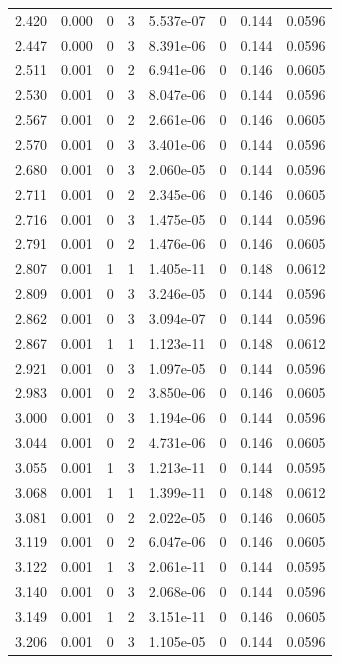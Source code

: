 \documentclass[preview]{standalone}
\begin{document}
{{{\begin{tabular}{L{1.2cm}C{1.2cm} C{0.3cm}C{0.5cm} C{1.4cm}C{1.4cm} C{1.4cm}C{1.4cm}}
  2.420  &  0.000  & 0     &  3 &  5.537e-07  & 0  & 0.144 &  0.0596   \\ 
  2.447  &  0.000  & 0     &  3 &  8.391e-06  & 0  & 0.144 &  0.0596   \\ 
  2.511  &  0.001  & 0     &  2 &  6.941e-06  & 0  & 0.146 &  0.0605   \\ 
  2.530  &  0.001  & 0     &  3 &  8.047e-06  & 0  & 0.144 &  0.0596   \\ 
  2.567  &  0.001  & 0     &  2 &  2.661e-06  & 0  & 0.146 &  0.0605   \\ 
  2.570  &  0.001  & 0     &  3 &  3.401e-06  & 0  & 0.144 &  0.0596   \\ 
  2.680  &  0.001  & 0     &  3 &  2.060e-05  & 0  & 0.144 &  0.0596   \\ 
  2.711  &  0.001  & 0     &  2 &  2.345e-06  & 0  & 0.146 &  0.0605   \\ 
  2.716  &  0.001  & 0     &  3 &  1.475e-05  & 0  & 0.144 &  0.0596   \\ 
  2.791  &  0.001  & 0     &  2 &  1.476e-06  & 0  & 0.146 &  0.0605   \\ 
  2.807  &  0.001  & 1     &  1 &  1.405e-11  & 0  & 0.148 &  0.0612   \\ 
  2.809  &  0.001  & 0     &  3 &  3.246e-05  & 0  & 0.144 &  0.0596   \\ 
  2.862  &  0.001  & 0     &  3 &  3.094e-07  & 0  & 0.144 &  0.0596   \\ 
  2.867  &  0.001  & 1     &  1 &  1.123e-11  & 0  & 0.148 &  0.0612   \\ 
  2.921  &  0.001  & 0     &  3 &  1.097e-05  & 0  & 0.144 &  0.0596   \\ 
  2.983  &  0.001  & 0     &  2 &  3.850e-06  & 0  & 0.146 &  0.0605   \\ 
  3.000  &  0.001  & 0     &  3 &  1.194e-06  & 0  & 0.144 &  0.0596   \\ 
  3.044  &  0.001  & 0     &  2 &  4.731e-06  & 0  & 0.146 &  0.0605   \\ 
  3.055  &  0.001  & 1     &  3 &  1.213e-11  & 0  & 0.144 &  0.0595   \\ 
  3.068  &  0.001  & 1     &  1 &  1.399e-11  & 0  & 0.148 &  0.0612   \\ 
  3.081  &  0.001  & 0     &  2 &  2.022e-05  & 0  & 0.146 &  0.0605   \\ 
  3.119  &  0.001  & 0     &  2 &  6.047e-06  & 0  & 0.146 &  0.0605   \\ 
  3.122  &  0.001  & 1     &  3 &  2.061e-11  & 0  & 0.144 &  0.0595   \\ 
  3.140  &  0.001  & 0     &  3 &  2.068e-06  & 0  & 0.144 &  0.0596   \\ 
  3.149  &  0.001  & 1     &  2 &  3.151e-11  & 0  & 0.146 &  0.0605   \\ 
  3.206  &  0.001  & 0     &  3 &  1.105e-05  & 0  & 0.144 &  0.0596   \\ 
\hline 
\end{tabular} 

}}}
\end{document}
